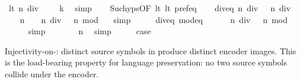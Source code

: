 \begin{isabellebody}
\ lt{}{\isacharcolon}{\kern0pt}\ {\isachardoublequoteopen}n{}\ div\ {}\ {\isacharless}{\kern0pt}\ {}\ {\isacharcircum}{\kern0pt}\ k{\isachardoublequoteclose}\ \isamarkupfalse%
\ simp\isanewline
\ \ \isamarkupfalse%
\ Suc{\isachardot}{\kern0pt}hyps{\isacharbrackleft}{\kern0pt}OF\ lt{}\ lt{}\ pref{\isacharunderscore}{\kern0pt}eq{\isacharbrackright}{\kern0pt}\isanewline
\ \ \isamarkupfalse%
\ div{\isacharunderscore}{\kern0pt}eq{\isacharcolon}{\kern0pt}\ {\isachardoublequoteopen}n{}\ div\ {}\ {\isacharequal}{\kern0pt}\ n{}\ div\ {}{\isachardoublequoteclose}\ \isakeywordONE{{\isachardot}{\kern0pt}}\isamarkupfalse%
\isanewline
\ \ \isamarkupfalse%
\ {\isachardoublequoteopen}n{}\ {\isacharequal}{\kern0pt}\ {}\ {\isacharasterisk}{\kern0pt}\ {\isacharparenleft}{\kern0pt}n{}\ div\ {}{\isacharparenright}{\kern0pt}\ {\isacharplus}{\kern0pt}\ n{}\ mod\ {}{\isachardoublequoteclose}\ \isamarkupfalse%
\ simp\isanewline
\ \ \isamarkupfalse%
\ \isamarkupfalse%
\ div{\isacharunderscore}{\kern0pt}eq\ mod{\isacharunderscore}{\kern0pt}eq\ \isamarkupfalse%
\ {\isachardoublequoteopen}{\isasymdots}\ {\isacharequal}{\kern0pt}\ {}\ {\isacharasterisk}{\kern0pt}\ {\isacharparenleft}{\kern0pt}n{}\ div\ {}{\isacharparenright}{\kern0pt}\ {\isacharplus}{\kern0pt}\ n{}\ mod\ {}{\isachardoublequoteclose}\isanewline
\ \ \ \ \isamarkupfalse%
\ simp\isanewline
\ \ \isamarkupfalse%
\ \isamarkupfalse%
\ {\isachardoublequoteopen}{\isasymdots}\ {\isacharequal}{\kern0pt}\ n{}{\isachardoublequoteclose}\ \isamarkupfalse%
\ simp\isanewline
\ \ \isamarkupfalse%
\ \isamarkupfalse%
\ {\isacharquery}{\kern0pt}case\ \isakeywordONE{{\isachardot}{\kern0pt}}\isamarkupfalse%
\isanewline
{}\isamarkupfalse%
%
\endisatagproof
{\isafoldproof}%
%
\isadelimproof
%
\endisadelimproof
%
\begin{isamarkuptext}%
Injectivity-on-\isa{{\isasymGamma}}: distinct source symbols in \isa{{\isasymGamma}}
  produce distinct encoder images.  This is the load-bearing
  property for language preservation: no two source symbols
  collide under the encoder.%

\end{isamarkuptext}
\end{isabellebody}
